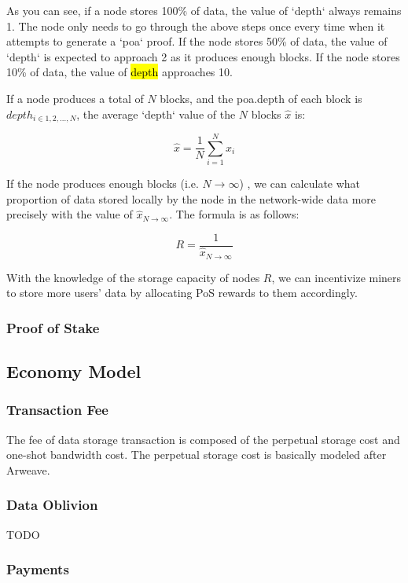 \documentclass[]{article}
\newcommand{\code}[1]{{%
  \sethlcolor{inlineBG}%
  \color{inlineFG}%
  \ttfamily
  \hl{#1}%
}}
\newcounter{subsubsubsection}[subsubsection]
\begin{document}
As you can see, if a node stores 100\% of data, the value of `depth` always remains 1. The node only needs to go through the above steps once every time when it attempts to generate a `poa` proof. If the node stores 50\% of data, the value of `depth` is expected to approach 2 as it produces enough blocks. If the node stores 10\% of data, the value of \code{depth} approaches 10.

If a node produces a total of $N$ blocks, and the poa.depth of each block is $depth_{i\in 1,2,...,N}$, the average `depth` value of the $N$ blocks $\hat{x}$ is:

$$
\hat{x} = \frac{1}{N} {\sum_{i=1}^N x_i}
$$


If the node produces enough blocks (i.e. $N \to \infty$) , we can calculate what proportion of data stored locally by the node in the network-wide data more precisely with the value of $\hat{x}_{N \to \infty}$. The formula is as follows:

$$
R = \frac{1}{\hat{x}_{{N \to \infty}}}
$$

With the knowledge of the storage capacity of nodes $R$, we can incentivize miners to store more users' data by allocating PoS rewards to them accordingly.

\subsubsection{Proof of Stake}



\subsection{Economy Model}

\subsubsection{Transaction Fee}

The fee of data storage transaction is composed of the perpetual storage cost and one-shot bandwidth cost. The perpetual storage cost is basically modeled after Arweave.

\subsubsection{Data Oblivion}

TODO

\subsubsection{Payments}
\end{document}
